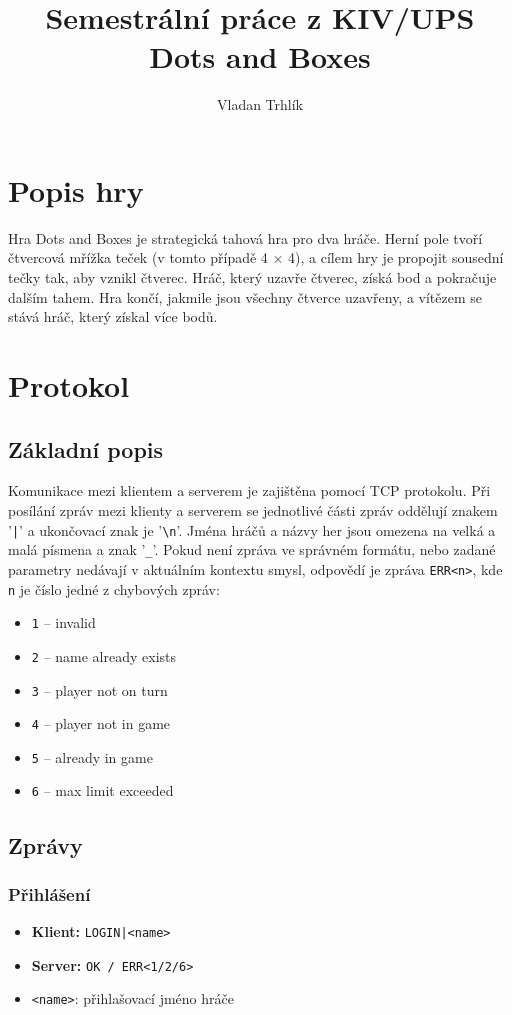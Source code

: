 \documentclass[11pt,a4paper]{article}
\author{Vladan Trhlík}
\title{%
	Semestrální práce z KIV/UPS \\
	\large Dots and Boxes  \\
}
\begin{document}
\maketitle

\section{Popis hry}
Hra Dots and Boxes je strategická tahová hra pro dva hráče. Herní pole tvoří čtvercová mřížka teček (v tomto případě 4 × 4), a cílem hry je propojit sousední tečky tak, aby vznikl čtverec. Hráč, který uzavře čtverec, získá bod a pokračuje dalším tahem. Hra končí, jakmile jsou všechny čtverce uzavřeny, a vítězem se stává hráč, který získal více bodů.
\section{Protokol}

\subsection{Základní popis}
Komunikace mezi klientem a serverem je zajištěna pomocí TCP protokolu. Při posílání zpráv mezi klienty a serverem se jednotlivé části zpráv oddělují znakem '\texttt{|}' a ukončovací znak je '\texttt{\textbackslash n}'. Jména hráčů a názvy her jsou omezena na velká a malá písmena a znak '\texttt{\_}'. Pokud není zpráva ve správném formátu, nebo zadané parametry nedávají v aktuálním kontextu smysl, odpovědí je zpráva \texttt{ERR<n>}, kde \texttt{n} je číslo jedné z chybových zpráv:
\begin{itemize}
	\item \texttt{1} -- invalid
	\item \texttt{2} -- name already exists
	\item \texttt{3} -- player not on turn
	\item \texttt{4} -- player not in game
	\item \texttt{5} -- already in game
	\item \texttt{6} -- max limit exceeded
\end{itemize}

\subsection{Zprávy}
\subsubsection*{Přihlášení}
\begin{itemize}
	\item \textbf{Klient:} \texttt{LOGIN|<name>}
	\item \textbf{Server:} \texttt{OK / ERR<1/2/6>}
	\item \texttt{<name>}: přihlašovací jméno hráče
\end{itemize}
\end{document}
